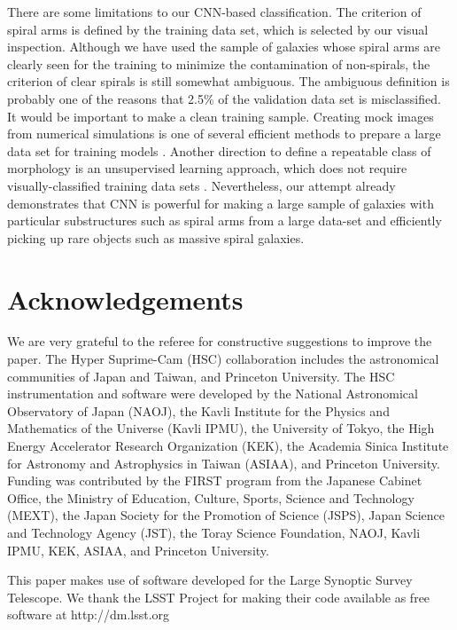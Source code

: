\documentclass[a4paper,fleqn,usenatbib]{mnras}
\begin{document}
There are some limitations to our CNN-based classification.
The criterion of spiral arms is defined by the training data set, which is selected by our visual inspection.
Although we have used the sample of galaxies whose spiral arms are clearly seen for the training to minimize the contamination of non-spirals, the criterion of clear spirals is still somewhat ambiguous.
The ambiguous definition is probably one of the reasons that 2.5\% of the validation data set is misclassified.
It would be important to make a clean training sample.
Creating mock images from numerical simulations is one of several efficient methods to prepare a large data set for training models \citep[e.g.,][]{2018ApJ...858..114H,2019A&A...625A.119M}.
Another direction to define a repeatable class of morphology is an unsupervised learning approach, which does not require visually-classified training data sets \citep[e.g.,][]{2018MNRAS.473.1108H, 2019arXiv190910537M}.
Nevertheless, our attempt already demonstrates that CNN is powerful for making a large sample of galaxies with particular substructures such as spiral arms from a large data-set and efficiently picking up rare objects such as massive spiral galaxies.



\section*{Acknowledgements}

We are very grateful to the referee for constructive suggestions to improve the paper.
The Hyper Suprime-Cam (HSC) collaboration includes the astronomical communities of Japan and Taiwan, and Princeton University.  The HSC instrumentation and software were developed by the National Astronomical Observatory of Japan (NAOJ), the Kavli Institute for the Physics and Mathematics of the Universe (Kavli IPMU), the University of Tokyo, the High Energy Accelerator Research Organization (KEK), the Academia Sinica Institute for Astronomy and Astrophysics in Taiwan (ASIAA), and Princeton University.  Funding was contributed by the FIRST program from the Japanese Cabinet Office, the Ministry of Education, Culture, Sports, Science and Technology (MEXT), the Japan Society for the Promotion of Science (JSPS), Japan Science and Technology Agency  (JST), the Toray Science  Foundation, NAOJ, Kavli IPMU, KEK, ASIAA, and Princeton University.
 
This paper makes use of software developed for the Large Synoptic Survey Telescope. We thank the LSST Project for making their code available as free software at  http://dm.lsst.org
 
\end{document}
